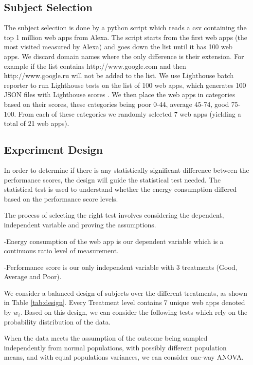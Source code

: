 \subsection{Subject Selection}
	
	The subject selection is done by a python script \cite{WEBSITE:11} which reads a csv containing the top 1 million web apps from Alexa. The script starts from the first web apps (the most visited measured by Alexa) and goes down the list until it has 100 web apps. We discard domain names where the only difference is their extension. For example if the list contains http://www.google.com and then http://www.google.ru will not be added to the list.
We use Lighthouse batch reporter to run Lighthouse tests on the list of 100 web apps, which generates 100 JSON files with Lighthouse scores \cite{WEBSITE:12}. 
We then place the web apps in categories based on their scores, these categories being poor 0-44, average 45-74, good 75-100. From each of these categories we randomly selected 7 web apps (yielding a total of 21 web apps). \newline
	
\subsection{Experiment Design}


In order to determine if there is any statistically significant
difference between the performance scores, the design will guide the statistical test needed. The statistical test is used to understand whether the energy consumption differed based on the performance score levels.

The process of selecting the right test involves considering the dependent, independent variable and proving the assumptions. 

-Energy consumption of the web app is our dependent variable which is a continuous ratio level of measurement.

-Performance score is our only independent variable with 3 treatments (Good, Average and Poor). \newline

We consider a balanced design of subjects over the different treatments, as shown in Table \ref{tab:design}. Every Treatment level contains 7 unique web apps denoted by $w_i$. Based on this design, we can consider the following tests which rely on the probability distribution of the data.


When the data meets the assumption of the outcome being sampled independently from normal populations, with possibly different population means, and with equal populations variances, we can consider one-way ANOVA. 

